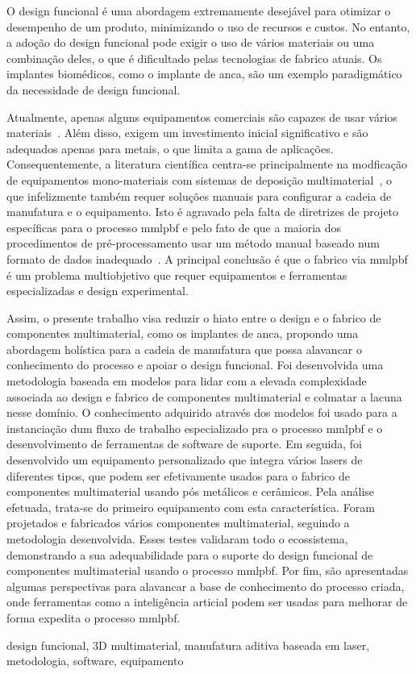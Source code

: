 %
O design funcional é uma abordagem extremamente desejável para otimizar o desempenho de um produto, minimizando o uso de recursos e custos.
No entanto, a adoção do design funcional pode exigir o uso de vários materiais
ou uma combinação deles, o que é dificultado pelas tecnologias de fabrico
atuais. Os implantes biomédicos, como o implante de anca, são um exemplo
paradigmático da necessidade de design funcional.

Atualmente, apenas alguns equipamentos comerciais são capazes de usar vários materiais~\cite{aconityMIDI, slm280}.
Além disso, exigem um investimento inicial significativo e são adequados apenas
para metais, o que limita a gama de aplicações.
Consequentemente, a literatura científica centra-se principalmente na modficação
de equipamentos mono-materiais com sistemas de deposição
multimaterial~\cite{bareth2022Implem, schneck2022capability,
  nadimpali2019MMSteels, anstaett2017fabrication, sing2015interfacial,
  liu2014interfacial}, o que infelizmente também requer soluções manuais para
configurar a cadeia de manufatura e o equipamento.
Isto é agravado pela falta de diretrizes de projeto específicas para o processo
\gls{mmlpbf} e pelo fato de que a maioria dos procedimentos de pré-processamento
usar um método manual baseado num formato de dados inadequado~\cite{schneck2021review}.
A principal conclusão é que o fabrico via \gls{mmlpbf} é um problema
multiobjetivo que requer equipamentos e ferramentas especializadas e design experimental.

Assim, o presente trabalho visa reduzir o hiato entre o design e o fabrico
de componentes multimaterial, como os implantes de anca, propondo uma
abordagem holística para a cadeia de manufatura que possa
alavancar o conhecimento do processo e apoiar o design funcional. Foi
desenvolvida uma metodologia baseada em modelos para lidar com a elevada
complexidade associada ao design e fabrico de componentes multimaterial e
colmatar a lacuna nesse domínio.
O conhecimento adquirido através dos modelos foi usado para a instanciação dum
fluxo de trabalho especializado pra o processo \gls{mmlpbf} e o desenvolvimento
de ferramentas de software de suporte.
Em seguida, foi desenvolvido um equipamento personalizado que integra vários
lasers de diferentes tipos, que podem ser efetivamente usados para o fabrico de
componentes multimaterial usando pós metálicos e cerâmicos. Pela análise
efetuada, trata-se do primeiro equipamento com esta característica.
%
Foram projetados e fabricados vários componentes multimaterial, seguindo a
metodologia desenvolvida. Esses testes validaram todo o ecossistema,
demonstrando a sua adequabilidade para o suporte do design funcional de
componentes multimaterial usando o processo \gls{mmlpbf}. Por fim, são
apresentadas algumas perspectivas para alavancar a base de conhecimento do
processo criada, onde ferramentas como a inteligência articial podem ser usadas
para melhorar de forma expedita o processo \gls{mmlpbf}.

\begin{keywords}
design funcional, 3D multimaterial, manufatura aditiva baseada em laser,
metodologia, software, equipamento
\end{keywords}
